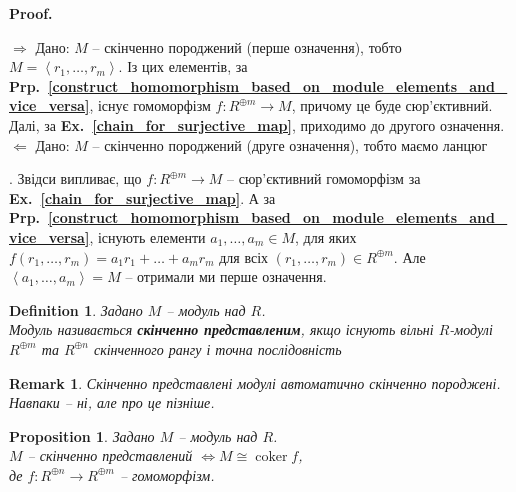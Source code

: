 \documentclass[a4paper, 10pt]{article}
\makeatletter
\def\rightproof{$\boxed{\Rightarrow}$ }
\def\leftproof{$\boxed{\Leftarrow}$ }
\theoremstyle{theoremdd}
\theoremstyle{theoremdd}
\newtheorem{definition}[theorem]{Definition}
\theoremstyle{theoremdd}
\theoremstyle{theoremdd}
\theoremstyle{theoremdd}
\theoremstyle{theoremdd}
\theoremstyle{theoremdd}
\theoremstyle{theoremdd}
\theoremstyle{theoremdd}
\newtheorem{proposition}[theorem]{Proposition}
\theoremstyle{theoremdd}
\theoremstyle{theoremdd}
\newtheorem{remark}[theorem]{Remark}
\theoremstyle{theoremdd}
\theoremstyle{theoremdd}
\theoremstyle{theoremdd}
\theoremstyle{theoremdd}
\renewenvironment{proof}[1][Proof.\\]{\par
\pushQED{\hfill \qed}%
\normalfont \topsep6\p@\@plus6\p@\relax
\trivlist
\item\relax
{\bfseries
#1\@addpunct{.}}\hspace\labelsep\ignorespaces
}{%
\popQED\endtrivlist\@endpefalse
}
\DeclareMathOperator{\coker}{coker}
\newcommand\exref[1]{\textbf{Ex.~\ref{#1}}}
\newcommand\prpref[1]{\textbf{Prp.~\ref{#1}}}
\makeatother
\begin{document}
\begin{proof}
\rightproof Дано: $M$ -- скінченно породжений (перше означення), тобто $M = \left< r_1,\dots,r_m\right>$. Із цих елементів, за \prpref{construct_homomorphism_based_on_module_elements_and_vice_versa}, існує гомоморфізм $f \colon R^{\oplus m} \to M$, причому це буде сюр'єктивний. Далі, за \exref{chain_for_surjective_map}, приходимо до другого означення.
\bigskip \\
\leftproof Дано: $M$ -- скінченно породжений (друге означення), тобто маємо ланцюг . Звідси випливає, що $f \colon R^{\oplus m} \to M$ -- сюр'єктивний гомоморфізм за \exref{chain_for_surjective_map}. А за \prpref{construct_homomorphism_based_on_module_elements_and_vice_versa}, існують елементи $a_1,\dots,a_m \in M$, для яких $f(r_1,\dots,r_m) = a_1r_1+\dots+a_mr_m$ для всіх $(r_1,\dots,r_m) \in R^{\oplus m}$. Але $\left< a_1,\dots,a_m \right> = M$ -- отримали ми перше означення.
\end{proof}

\begin{definition}
Задано $M$ -- модуль над $R$.\\
Модуль називається \textbf{скінченно представленим}, якщо існують вільні $R$-модулі $R^{\oplus m}$ та $R^{\oplus n}$ скінченного рангу і точна послідовність
\begin{figure}[H]
\centering
{}
\end{figure}
\end{definition}

\begin{remark}
Скінченно представлені модулі автоматично скінченно породжені. Навпаки -- ні, але про це пізніше.
\end{remark}

\begin{proposition}
Задано $M$ -- модуль над $R$.\\
$M$ -- скінченно представлений $\iff M \cong \coker f$, \\
де $f \colon R^{\oplus n} \to R^{\oplus m}$ -- гомоморфізм.
\end{proposition}
\end{document}
